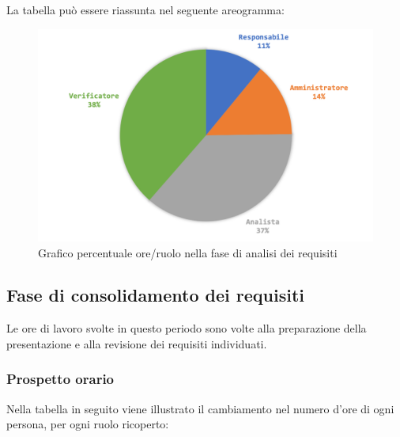 			La tabella può essere riassunta nel seguente areogramma:
			\begin{figure}[H]
				\centering
				\includegraphics[width=0.8\linewidth]{images/consuntivo/analisiCons2.png}
				\caption{Grafico percentuale ore/ruolo nella fase di analisi dei requisiti}
				\label{fig:grafico costi ruolo fase analisi dei requisiti}
			\end{figure}
		
		

		\subsection{Fase di consolidamento dei requisiti}
		Le ore di lavoro svolte in questo periodo sono volte alla preparazione della presentazione e alla revisione dei requisiti individuati. 
		\subsubsection{Prospetto orario}
			Nella tabella in seguito viene illustrato il cambiamento nel numero d'ore di ogni persona, per ogni ruolo ricoperto:
			
